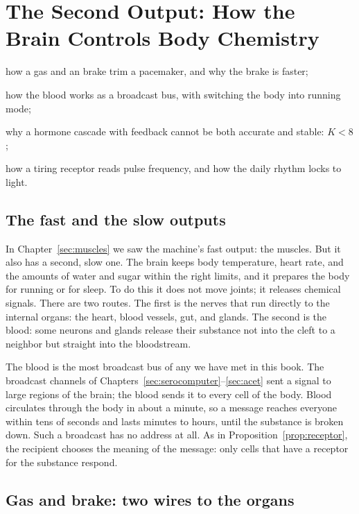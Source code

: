 \chapter{The Second Output: How the Brain Controls Body Chemistry}
\label{sec:chemoutput}
\begin{chaptergoals}
\item how a  gas and an  brake trim a pacemaker, and why the brake is faster;
\item how the blood works as a broadcast bus, with  switching the body into running mode;
\item why a hormone cascade with feedback cannot be both accurate and stable: $K<8$;
\item how a tiring receptor reads pulse frequency, and how the daily rhythm locks to light.
\end{chaptergoals}

\section{The fast and the slow outputs}

In Chapter~\ref{sec:muscles} we saw the machine's fast output: the muscles. But it also has a second, slow one. The brain keeps body temperature, heart rate, and the amounts of water and sugar within the right limits, and it prepares the body for running or for sleep. To do this it does not move joints; it releases chemical signals. There are two routes. The first is the nerves that run directly to the internal organs: the heart, blood vessels, gut, and glands. The second is the blood: some neurons and glands release their substance not into the cleft to a neighbor but straight into the bloodstream.

The blood is the most broadcast bus of any we have met in this book. The broadcast channels of Chapters~\ref{sec:serocomputer}--\ref{sec:acet} sent a signal to large regions of the brain; the blood sends it to every cell of the body. Blood circulates through the body in about a minute, so a message reaches everyone within tens of seconds and lasts minutes to hours, until the substance is broken down. Such a broadcast has no address at all. As in Proposition~\ref{prop:receptor}, the recipient chooses the meaning of the message: only cells that have a receptor for the substance respond.

\section{Gas and brake: two wires to the organs}

